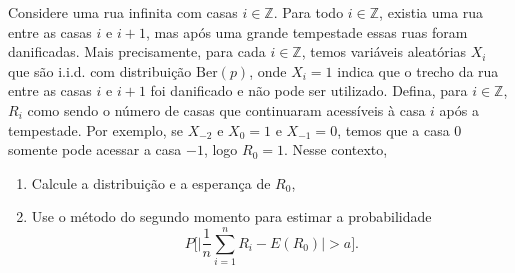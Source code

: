 \begin{exercise}
  \label{x:casas_tempestade}
  Considere uma rua infinita com casas $i \in \mathbb{Z}$.
  Para todo $i \in \mathbb{Z}$, existia uma rua entre as casas $i$ e $i+1$, mas após uma grande tempestade essas ruas foram danificadas.
  Mais precisamente, para cada $i \in \mathbb{Z}$, temos variáveis aleatórias $X_i$ que são i.i.d. com distribuição $\text{Ber}(p)$, onde $X_i = 1$ indica que o trecho da rua entre as casas $i$ e $i + 1$ foi danificado e não pode ser utilizado.
  Defina, para $i \in \mathbb{Z}$, $R_i$ como sendo o número de casas que continuaram acessíveis à casa $i$ após a tempestade.
  Por exemplo, se $X_{-2}$ e $X_0 = 1$ e $X_{-1} = 0$, temos que a casa $0$ somente pode acessar a casa $-1$, logo $R_0 = 1$.
  Nesse contexto,
  \begin{enumerate}[\quad a)]
  \item Calcule a distribuição e a esperança de $R_0$,
  \item Use o método do segundo momento para estimar a probabilidade
    \begin{equation}
      P \Big[ \Big| \frac{1}{n} \sum_{i=1}^n R_i - E(R_0) \Big| > a \Big].
    \end{equation}
  \end{enumerate}
\end{exercise}






